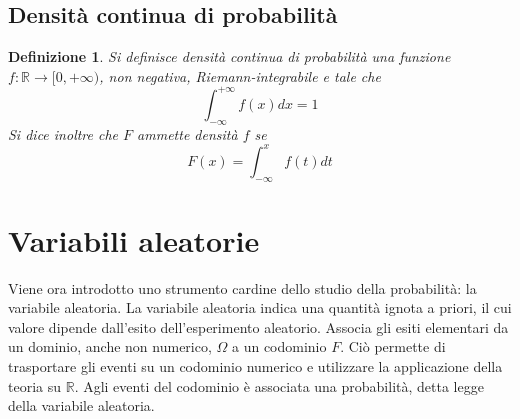 \documentclass[a4paper,12pt]{article}
\theoremstyle{break}
\newtheorem{definition}{Definizione}[section]
\numberwithin{equation}{section}
\begin{document}
\subsection{Densità continua di probabilità}
\begin{definition}
Si definisce densità continua di probabilità una funzione \(f:\mathbb{R} \to [0, +\infty)\), non negativa, Riemann-integrabile e tale che 
\[
  \int_{-\infty}^{+\infty} f(x) dx = 1
\]    
Si dice inoltre che \(F\) ammette densità \(f\) se 
\[
  F(x)  =\int_{-\infty}^x f(t) dt
\]
\end{definition}
\section{Variabili aleatorie}
Viene ora introdotto uno strumento cardine dello studio della probabilità: la variabile aleatoria. La variabile aleatoria indica una quantità ignota a priori, il cui valore dipende dall'esito dell'esperimento aleatorio. Associa gli esiti elementari da un dominio, anche non numerico, \(\Omega\) a un codominio \(F\). Ciò permette di trasportare gli eventi su un codominio numerico e utilizzare la applicazione della teoria su \(\mathbb{R}\). Agli eventi del codominio è associata una probabilità, detta legge della variabile aleatoria. 
\end{document}
